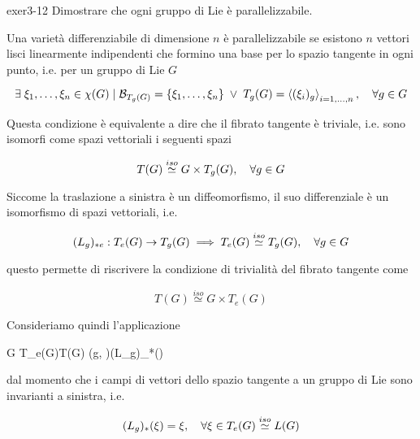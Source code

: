 {exer3-12}
{
Dimostrare che ogni gruppo di Lie è parallelizzabile.
}
{

Una varietà differenziabile di dimensione $ n $ è parallelizzabile se esistono $ n $ vettori lisci linearmente indipendenti che formino una base per lo spazio tangente in ogni punto, i.e. per un gruppo di Lie $ G $

\begin{equation}
	\E \xi_{1}, \dots, \xi_{n} \in \chi(G) \mid %
	\B_{T_{g}(G)} = \left\{ \xi_{1}, \dots, \xi_{n} \right\} %
	\; \lor \; T_{g}(G) = \ev{(\xi_{i})_{g}}_{i=1,\dots,n} %
	\qcomma \forall g \in G
\end{equation}

Questa condizione è equivalente a dire che il fibrato tangente è triviale, i.e. sono isomorfi come spazi vettoriali i seguenti spazi

\begin{equation}
	T(G) \stackrel{iso}{\simeq} G \times T_{g}(G) \qcomma \forall g \in G
\end{equation}

Siccome la traslazione a sinistra è un diffeomorfismo, il suo differenziale è un isomorfismo di spazi vettoriali, i.e.

\begin{equation}
	(L_{g})_{*e} : T_{e}(G) \to T_{g}(G) %
	\implies %
	T_{e}(G) \stackrel{iso}{\simeq} T_{g}(G) \qcomma \forall g \in G
\end{equation}

questo permette di riscrivere la condizione di trivialità del fibrato tangente come

\begin{equation}
	T(G) \stackrel{iso}{\simeq} G \times T_{e}(G)
\end{equation}

Consideriamo quindi l'applicazione

\map{\varphi}
	{G \times T_{e}(G)}{T(G)}
	{(g, \xi)}{(L_{g})_{*}(\xi)}

dal momento che i campi di vettori dello spazio tangente a un gruppo di Lie sono invarianti a sinistra, i.e.

\begin{equation}
	(L_{g})_{*}(\xi) = \xi \qcomma \forall \xi \in T_{e}(G) \stackrel{iso}{\simeq} L(G)
\end{equation}

}
